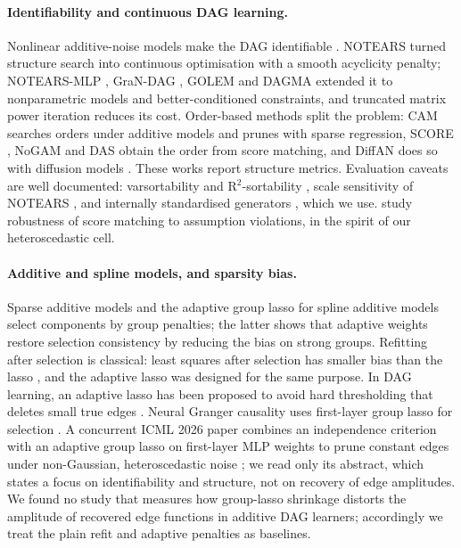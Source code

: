 \documentclass[11pt,a4paper]{article}
\begin{document}
\paragraph{Identifiability and continuous DAG learning.} Nonlinear additive-noise models make the DAG identifiable \citep{hoyer2008,peters2014}. NOTEARS \citep{zheng2018} turned structure search into continuous optimisation with a smooth acyclicity penalty; NOTEARS-MLP \citep{zheng2020}, GraN-DAG \citep{lachapelle2020}, GOLEM \citep{ng2020} and DAGMA \citep{bello2022} extended it to nonparametric models and better-conditioned constraints, and truncated matrix power iteration \citep{zhang2022tmpi} reduces its cost. Order-based methods split the problem: CAM \citep{buhlmann2014} searches orders under additive models and prunes with sparse regression, SCORE \citep{rolland2022}, NoGAM \citep{montagna2023nogam} and DAS \citep{montagna2023das} obtain the order from score matching, and DiffAN does so with diffusion models \citep{sanchez2023}. These works report structure metrics. Evaluation caveats are well documented: varsortability and R$^2$-sortability \citep{reisach2021,reisach2023}, scale sensitivity of NOTEARS \citep{kaiser2021,seng2024}, and internally standardised generators \citep{ormaniec2025}, which we use. \citet{montagna2023assumptions} study robustness of score matching to assumption violations, in the spirit of our heteroscedastic cell.

\paragraph{Additive and spline models, and sparsity bias.} Sparse additive models \citep{ravikumar2009} and the adaptive group lasso for spline additive models \citep{huang2010} select components by group penalties; the latter shows that adaptive weights restore selection consistency by reducing the bias on strong groups. Refitting after selection is classical: least squares after selection has smaller bias than the lasso \citep{belloni2013}, and the adaptive lasso \citep{zou2006} was designed for the same purpose. In DAG learning, an adaptive lasso has been proposed to avoid hard thresholding that deletes small true edges \citep{xu2022}. Neural Granger causality uses first-layer group lasso for selection \citep{tank2022}. A concurrent ICML 2026 paper combines an independence criterion with an adaptive group lasso on first-layer MLP weights to prune constant edges under non-Gaussian, heteroscedastic noise \citep{yao2026}; we read only its abstract, which states a focus on identifiability and structure, not on recovery of edge amplitudes. We found no study that measures how group-lasso shrinkage distorts the amplitude of recovered edge functions in additive DAG learners; accordingly we treat the plain refit and adaptive penalties as baselines.
\end{document}
